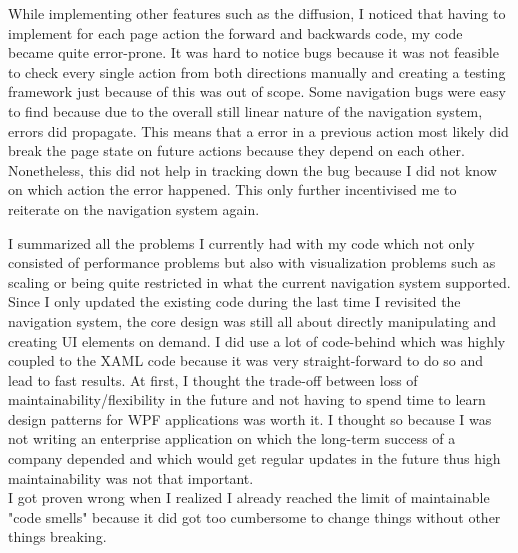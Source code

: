 \par

While implementing other features such as the diffusion, I noticed that having to implement for each page action the forward and backwards code, my code became quite error-prone. It was hard to notice bugs because it was not feasible to check every single action from both directions manually and creating a testing framework just because of this was out of scope. Some navigation bugs were easy to find because due to the overall still linear nature of the navigation system, errors did propagate. This means that a error in a previous action most likely did break the page state on future actions because they depend on each other. Nonetheless, this did not help in tracking down the bug because I did not know on which action the error happened. This only further incentivised me to reiterate on the navigation system again.

\par

I summarized all the problems I currently had with my code which not only consisted of performance problems but also with visualization problems such as scaling or being quite restricted in what the current navigation system supported. Since I only updated the existing code during the last time I revisited the navigation system, the core design was still all about directly manipulating and creating UI elements on demand. I did use a lot of code-behind which was highly coupled to the XAML code because it was very straight-forward to do so and lead to fast results. At first, I thought the trade-off between loss of maintainability/flexibility in the future and not having to spend time to learn design patterns for WPF applications was worth it. I thought so because I was not writing an enterprise application on which the long-term success of a company depended and which would get regular updates in the future thus high maintainability was not that important.\\
I got proven wrong when I realized I already reached the limit of maintainable "code smells" because it did got too cumbersome to change things without other things breaking.
